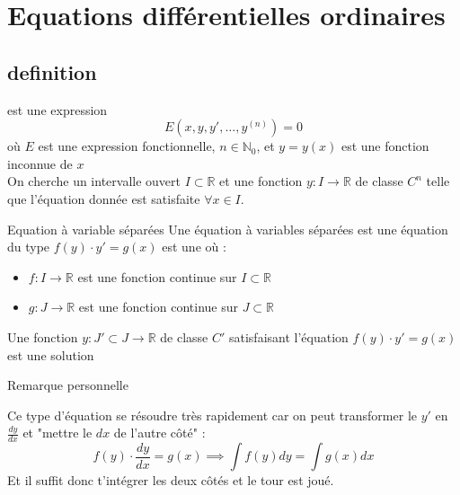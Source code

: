 
\chapter{Equations différentielles ordinaires}
\section{definition} 
\begin{definition}
     est une expression \[E(x, y, y', \dots, y^{(n)}) = 0 \]
    où $E$ est une expression fonctionnelle, $n \in \mathbb{N}_0$, et $y = y (x)$ est une fonction inconnue de $x$ \\
    On cherche un intervalle ouvert $I \subset \mathbb{R}$ et une fonction $y : I \to \mathbb{R}$ de classe $C^n$ telle que l'équation donnée est satisfaite $\forall x \in I$.
\end{definition}
\begin{parag}{Equation à variable séparées} 
 Une équation à variables séparées est une équation du type $f(y)\cdot y' = g(x)$ est une  où : 
 \begin{itemize}
     \item $f: I \to \mathbb{R}$ est une fonction continue sur $I \subset \mathbb{R}$
     \item $g: J \to \mathbb{R}$ est une fonction continue sur $J \subset \mathbb{R}$
 \end{itemize}
 Une fonction $y: J' \subset J \to \mathbb{R}$ de classe $C'$ satisfaisant l'équation $f(y)\cdot y' = g(x)$ est une solution
 \begin{subparag}{Remarque personnelle}
     \begin{framedremark}
         Ce type d'équation se résoudre très rapidement car on peut transformer le $y'$ en $\frac{dy}{dx}$ et "mettre le $dx$ de l'autre côté" : 
         \[f(y)\cdot\frac{dy}{dx} = g(x) \implies \int f(y)dy = \int g(x) dx\] 
         Et il suffit donc t'intégrer les deux côtés et le tour est joué.
     \end{framedremark}
 \end{subparag}
\end{parag}

